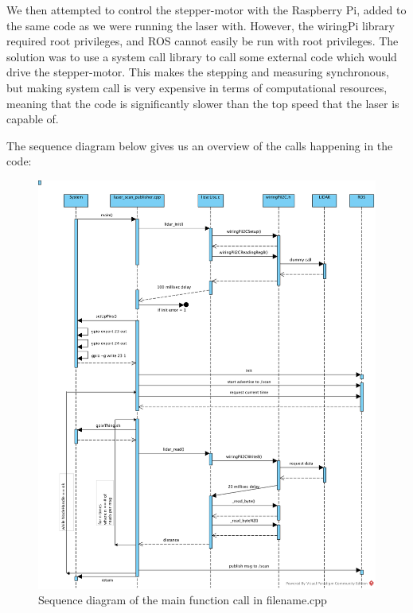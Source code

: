 We then attempted to control the stepper-motor with the Raspberry Pi, added to the same code as we were running the laser with. However, the wiringPi library required root privileges, and ROS cannot easily be run with root privileges. The solution was to use a system call library to call some external code which would drive the stepper-motor. This makes the stepping and measuring synchronous, but making system call is very expensive in terms of computational resources, meaning that the code is significantly slower than the top speed that the laser is capable of.



\clearpage
The sequence diagram below gives us an overview of the calls happening in the code:

\begin{figure}[H]
	\centering
	\includegraphics[scale=.6]{images/laser-module.png}
	\caption{Sequence diagram of the main function call in filename.cpp}
	\label{fig:lasermodule}
\end{figure}

